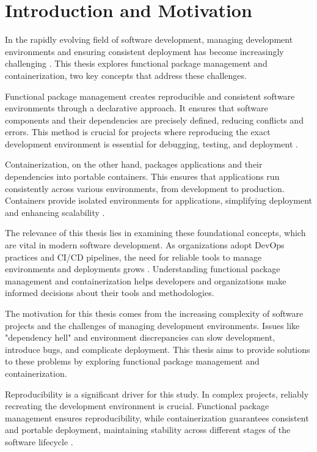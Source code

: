 \chapter{Introduction and Motivation}

In the rapidly evolving field of software development,
managing development environments and ensuring consistent deployment
has become increasingly challenging \cite{ContainerTechnology}.
This thesis explores functional package management and containerization,
two key concepts that address these challenges.

Functional package management creates reproducible
and consistent software environments through a declarative approach.
It ensures that software components
and their dependencies are precisely defined, reducing conflicts and errors.
This method is crucial for projects where reproducing the exact development environment is essential
for debugging, testing, and deployment \cite{malkaIncreasingTrustOpen2024}.

Containerization, on the other hand, packages applications
and their dependencies into portable containers.
This ensures that applications run consistently across various environments,
from development to production.
Containers provide isolated environments for applications,
simplifying deployment and enhancing scalability \cite{pahlContainerizationPaaSCloud2015}.

The relevance of this thesis lies in examining these foundational concepts,
which are vital in modern software development.
As organizations adopt
DevOps \cite{DevOps2024} practices
and CI/CD \cite{CICD2024} pipelines,
the need for reliable tools to manage environments and deployments grows \cite{ContainerTechnology}.
Understanding functional package management
and containerization helps developers and organizations make informed decisions about their tools and methodologies.

The motivation for this thesis comes from the increasing complexity of software projects
and the challenges of managing development environments.
Issues like "dependency hell" \cite{DependencyHell2024}
and environment discrepancies can slow development, introduce bugs, and complicate deployment.
This thesis aims to provide solutions to these problems
by exploring functional package management and containerization.

Reproducibility is a significant driver for this study.
In complex projects, reliably recreating the development environment is crucial.
Functional package management ensures reproducibility,
while containerization guarantees consistent and portable deployment,
maintaining stability across different stages of the software lifecycle \cite{malkaIncreasingTrustOpen2024}.

